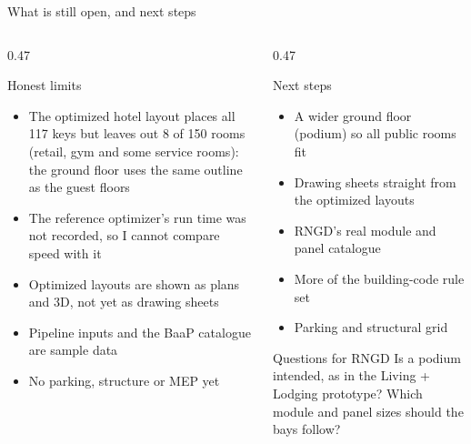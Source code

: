 \documentclass[9pt,aspectratio=169]{beamer}
\begin{document}
\begin{frame}{What is still open, and next steps}
\begin{columns}[T]
\begin{column}{0.47\textwidth}
\begin{block}{Honest limits}
\begin{itemize}
\item The optimized hotel layout places all 117 keys but leaves out 8 of 150 rooms (retail, gym and some service rooms): the ground floor uses the same outline as the guest floors
\item The reference optimizer's run time was not recorded, so I cannot compare speed with it
\item Optimized layouts are shown as plans and 3D, not yet as drawing sheets
\item Pipeline inputs and the BaaP catalogue are sample data
\item No parking, structure or MEP yet
\end{itemize}
\end{block}
\end{column}
\begin{column}{0.47\textwidth}
\begin{block}{Next steps}
\begin{itemize}
\item A wider ground floor (podium) so all public rooms fit
\item Drawing sheets straight from the optimized layouts
\item RNGD's real module and panel catalogue
\item More of the building-code rule set
\item Parking and structural grid
\end{itemize}
\end{block}
\begin{block}{Questions for RNGD}
Is a podium intended, as in the Living + Lodging prototype? Which module and panel sizes should the bays follow?
\end{block}
\end{column}
\end{columns}
\end{frame}
\end{document}
